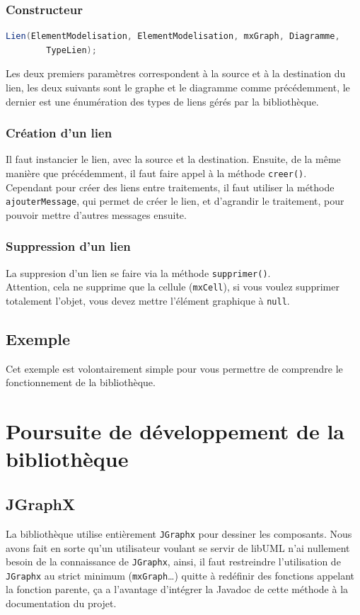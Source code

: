 \documentclass[12pt,a4paper,oneside]{book}
\begin{document}
	\subsection{Constructeur}
	\begin{lstlisting}[language=Java]
Lien(ElementModelisation, ElementModelisation, mxGraph, Diagramme, 
		TypeLien);
	\end{lstlisting}
	Les deux premiers paramètres correspondent à la source et à la destination du lien, les deux suivants sont le graphe et le diagramme comme précédemment, le 
	dernier est une énumération des types de liens gérés par la bibliothèque.
	\subsection{Création d'un lien}
	Il faut instancier le lien, avec la source et la destination. Ensuite, de la même manière que précédemment, il faut faire appel à la méthode \texttt{creer()}.\\
	Cependant pour créer des liens entre traitements, il faut utiliser la méthode \texttt{ajouterMessage}, qui permet de créer le lien, et d'agrandir le traitement,
	pour pouvoir mettre d'autres messages ensuite.

	\subsection{Suppression d'un lien}
	La suppresion d'un lien se faire via la méthode \texttt{supprimer()}. \\
	Attention, cela ne supprime que la cellule (\texttt{mxCell}), si vous voulez supprimer totalement l'objet, vous devez mettre l'élément graphique à \texttt{null}.


	\section{Exemple}
	
	Cet exemple est volontairement simple pour vous permettre de comprendre le fonctionnement de la bibliothèque.
	\chapter{Poursuite de développement de la bibliothèque}				
	\nouveauChapitre
	\section{JGraphX}
	La bibliothèque utilise entièrement \texttt{JGraphx} pour dessiner les composants. Nous avons fait en sorte qu'un utilisateur voulant se servir de libUML
	n'ai nullement besoin de la connaissance de \texttt{JGraphx}, ainsi, il faut restreindre l'utilisation de \texttt{JGraphx} au strict minimum (\texttt{mxGraph}\ldots) quitte
	à redéfinir des fonctions appelant la fonction parente, ça a l'avantage d'intégrer la Javadoc de cette méthode à la documentation du projet.
\end{document}

